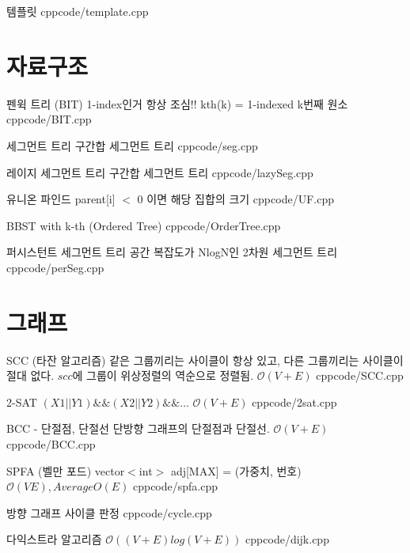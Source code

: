 \documentclass[landscape, 10pt, a4paper, oneside, twocolumn]{extarticle}
\begin{document}
\maketitlepage
\pagebreak











\Algorithm
{템플릿}
{}
{}
{cpp}{code/template.cpp}

\section{자료구조}

\Algorithm
{펜윅 트리 (BIT)}
{1-index인거 항상 조심!! kth(k) = 1-indexed k번째 원소}
{}
{cpp}{code/BIT.cpp}

\Algorithm
{세그먼트 트리}
{구간합 세그먼트 트리}
{}
{cpp}{code/seg.cpp}

\Algorithm
{레이지 세그먼트 트리}
{구간합 세그먼트 트리}
{}
{cpp}{code/lazySeg.cpp}

\Algorithm
{유니온 파인드}
{parent[i] ${<}$ 0 이면 해당 집합의 크기
}
{}
{cpp}{code/UF.cpp}

 \Algorithm
{BBST with k-th (Ordered Tree)}
{}
{}
{cpp}{code/OrderTree.cpp}

\Algorithm
{퍼시스턴트 세그먼트 트리}
{공간 복잡도가 NlogN인 2차원 세그먼트 트리}
{}
{cpp}{code/perSeg.cpp}



\section{그래프}

\Algorithm
{SCC (타잔 알고리즘)}
{
같은 그룹끼리는 사이클이 항상 있고, 다른 그룹끼리는 사이클이 절대 없다. $scc$에 그룹이 위상정렬의 역순으로 정렬됨.
}
{$\mathcal{O}(V+E)$}
{cpp}{code/SCC.cpp}

\Algorithm
{2-SAT}
{$(X1||Y1)\&\&(X2||Y2)\&\&\dots$
}
{$\mathcal{O}(V+E)$}
{cpp}{code/2sat.cpp}

\Algorithm
{BCC - 단절점, 단절선}
{단방향 그래프의 단절점과 단절선. }
{$\mathcal{O}(V+E)$}
{cpp}{code/BCC.cpp}

\Algorithm
{SPFA (벨만 포드)}
{vector${<}$int${>}$ adj[MAX] = (가중치, 번호)}
{$\mathcal{O}(VE),{}Average {O}(E)$}
{cpp}{code/spfa.cpp}

\Algorithm
{방향 그래프 사이클 판정}
{}
{}
{cpp}{code/cycle.cpp}

\Algorithm
{다익스트라 알고리즘}
{}
{$\mathcal{O}((V+E)log(V+E))$}
{cpp}{code/dijk.cpp}
\end{document}
